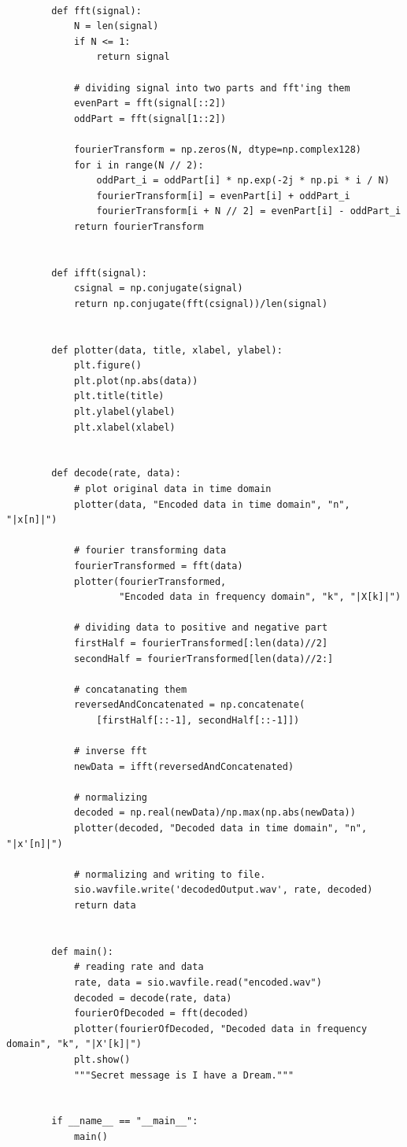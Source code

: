 \documentclass[10pt,a4paper, margin=1in]{article}
\begin{document}
\begin{enumerate}
\begin{lstlisting}
        
        def fft(signal):
            N = len(signal)
            if N <= 1:
                return signal
        
            # dividing signal into two parts and fft'ing them
            evenPart = fft(signal[::2])
            oddPart = fft(signal[1::2])
        
            fourierTransform = np.zeros(N, dtype=np.complex128)
            for i in range(N // 2):
                oddPart_i = oddPart[i] * np.exp(-2j * np.pi * i / N)
                fourierTransform[i] = evenPart[i] + oddPart_i
                fourierTransform[i + N // 2] = evenPart[i] - oddPart_i
            return fourierTransform
        
        
        def ifft(signal):
            csignal = np.conjugate(signal)
            return np.conjugate(fft(csignal))/len(signal)
        
        
        def plotter(data, title, xlabel, ylabel):
            plt.figure()
            plt.plot(np.abs(data))
            plt.title(title)
            plt.ylabel(ylabel)
            plt.xlabel(xlabel)
        
        
        def decode(rate, data):
            # plot original data in time domain
            plotter(data, "Encoded data in time domain", "n", "|x[n]|")
        
            # fourier transforming data
            fourierTransformed = fft(data)
            plotter(fourierTransformed,
                    "Encoded data in frequency domain", "k", "|X[k]|")
        
            # dividing data to positive and negative part
            firstHalf = fourierTransformed[:len(data)//2]
            secondHalf = fourierTransformed[len(data)//2:]
        
            # concatanating them
            reversedAndConcatenated = np.concatenate(
                [firstHalf[::-1], secondHalf[::-1]])
        
            # inverse fft
            newData = ifft(reversedAndConcatenated)
        
            # normalizing
            decoded = np.real(newData)/np.max(np.abs(newData))
            plotter(decoded, "Decoded data in time domain", "n", "|x'[n]|")
        
            # normalizing and writing to file.
            sio.wavfile.write('decodedOutput.wav', rate, decoded)
            return data
        
        
        def main():
            # reading rate and data
            rate, data = sio.wavfile.read("encoded.wav")
            decoded = decode(rate, data)
            fourierOfDecoded = fft(decoded)
            plotter(fourierOfDecoded, "Decoded data in frequency domain", "k", "|X'[k]|")
            plt.show()
            """Secret message is I have a Dream."""
        
        
        if __name__ == "__main__":
            main()
        
                        
    \end{lstlisting}


\end{enumerate}
\end{document}
